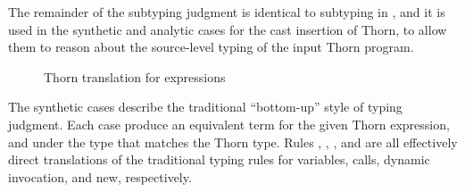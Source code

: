 \documentclass[a4paper,USenglish]{tex/lipics-v2016}
\begin{document}
The remainder of the subtyping judgment is identical to subtyping in \kafka, and
it is used in the synthetic and analytic cases for the cast insertion of Thorn,
to allow them to reason about the source-level typing of the input Thorn
program.

\begin{figure}[h!]
\begin{mathpar}





\end{mathpar}
\caption{Thorn translation for expressions}
\label{fig:thorntrans_exp}
\end{figure}

The synthetic cases describe the traditional ``bottom-up'' style of typing
judgment. Each case produce an equivalent  \kafka term for the given Thorn
expression, and under the \kafka type that matches the Thorn type. Rules
, , , and  are all
effectively  direct translations of the traditional typing rules for variables,
calls, dynamic invocation, and new, respectively.
\end{document}

